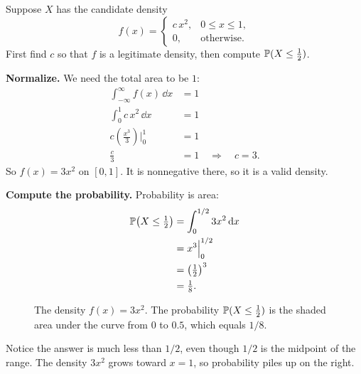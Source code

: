 \begin{example}
\label{ch10:ex-quadratic}
Suppose $X$ has the candidate density
\[
  f(x) = \begin{cases} c\,x^2, & 0 \le x \le 1,\\[2pt] 0, & \text{otherwise.}\end{cases}
\]
First find $c$ so that $f$ is a legitimate density, then compute
$\P(X \le \tfrac12)$.

\textbf{Normalize.} We need the total area to be $1$:
\begin{align*}
  \int_{-\infty}^{\infty} f(x)\,\dd x &= 1 \\
  \int_0^1 c\,x^2 \,\dd x &= 1 \\
  c \left( \frac{x^3}{3} \right) \Bigg|_0^1 &= 1 \\
  \frac{c}{3} &= 1 \quad\Longrightarrow\quad c = 3 .
\end{align*}
So $f(x) = 3x^2$ on $[0,1]$. It is nonnegative there, so it is a valid density.

\textbf{Compute the probability.} Probability is area:
\begin{align*}
  \P\!\left(X \le \tfrac12\right) &= \int_0^{1/2} 3x^2 \,\dd x \\
    &= x^3 \Big|_0^{1/2} \\
    &= \left(\tfrac12\right)^3 \\
    &= \tfrac18 .
\end{align*}

\begin{figure}[H]
\centering
{}
\caption{The density $f(x) = 3x^2$. The probability $\P(X \le \frac{1}{2})$ is the shaded area under the curve from $0$ to $0.5$, which equals $1/8$.}
\label{ch10:fig-ex-quadratic}
\end{figure}
Notice the answer is much less than $1/2$, even though $1/2$ is the midpoint of the
range. The density $3x^2$ grows toward $x=1$, so probability piles up on the right.
\end{example}

